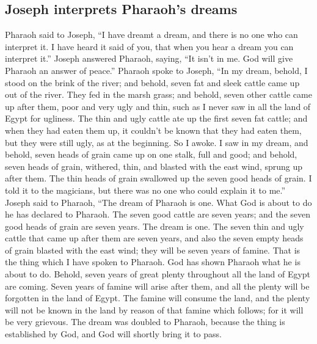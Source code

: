 \hypertarget{joseph-interprets-pharaohs-dreams}{%
\subsection{Joseph interprets Pharaoh's
dreams}\label{joseph-interprets-pharaohs-dreams}}

 Pharaoh said to Joseph, ``I have dreamt a dream, and
there is no one who can interpret it. I have heard it said of you, that
when you hear a dream you can interpret it.''  Joseph
answered Pharaoh, saying, ``It isn't in me. God will give Pharaoh an
answer of peace.''  Pharaoh spoke to Joseph, ``In my
dream, behold, I stood on the brink of the river;  and
behold, seven fat and sleek cattle came up out of the river. They fed in
the marsh grass;  and behold, seven other cattle came up
after them, poor and very ugly and thin, such as I never saw in all the
land of Egypt for ugliness.  The thin and ugly cattle ate
up the first seven fat cattle;  and when they had eaten
them up, it couldn't be known that they had eaten them, but they were
still ugly, as at the beginning. So I awoke.  I saw in my
dream, and behold, seven heads of grain came up on one stalk, full and
good;  and behold, seven heads of grain, withered, thin,
and blasted with the east wind, sprung up after them. 
The thin heads of grain swallowed up the seven good heads of grain. I
told it to the magicians, but there was no one who could explain it to
me.''  Joseph said to Pharaoh, ``The dream of Pharaoh is
one. What God is about to do he has declared to Pharaoh. 
The seven good cattle are seven years; and the seven good heads of grain
are seven years. The dream is one.  The seven thin and
ugly cattle that came up after them are seven years, and also the seven
empty heads of grain blasted with the east wind; they will be seven
years of famine.  That is the thing which I have spoken
to Pharaoh. God has shown Pharaoh what he is about to do.
 Behold, seven years of great plenty throughout all the
land of Egypt are coming.  Seven years of famine will
arise after them, and all the plenty will be forgotten in the land of
Egypt. The famine will consume the land,  and the plenty
will not be known in the land by reason of that famine which follows;
for it will be very grievous.  The dream was doubled to
Pharaoh, because the thing is established by God, and God will shortly
bring it to pass.

